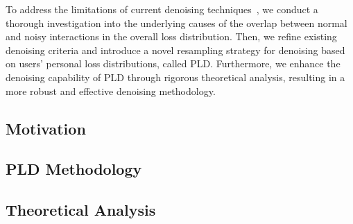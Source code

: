 To address the limitations of current denoising techniques~\cite{wang2021denoising, he2024double, gao2022selfguided, lin2023autodenoise}, we conduct a thorough investigation into the underlying causes of the overlap between normal and noisy interactions in the overall loss distribution. Then, we refine existing denoising criteria and introduce a novel resampling strategy for denoising based on users' personal loss distributions, called PLD. Furthermore, we enhance the denoising capability of PLD through rigorous theoretical analysis, resulting in a more robust and effective denoising methodology.


\subsection{Motivation}


\subsection{PLD Methodology}


\subsection{Theoretical Analysis}
